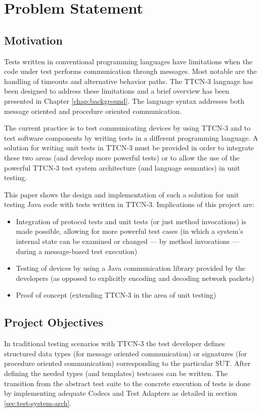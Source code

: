 \chapter{Problem Statement}
\label{chap:motivation}


\section{Motivation}
Tests written in conventional programming languages have limitations
when the code under test performs communication through messages.
Most notable are the handling of timeouts and alternative behavior paths.
The \ac{TTCN-3} language has been designed to address these limitations
and a brief overview has been presented in Chapter \ref{chap:background}.
The language syntax addresses
both message oriented and procedure oriented communication.

The current practice is to test communicating devices
by using \ac{TTCN-3} and to test software components
by writing tests in a different programming language.
A solution for writing unit tests in \ac{TTCN-3} must be provided
in order to integrate these two areas (and develop more powerful tests)
or to allow the use of the powerful \ac{TTCN-3} test system architecture
(and language semantics) in unit testing.

This paper shows the design and implementation of such a solution
for unit testing Java code with tests written in \ac{TTCN-3}.
Implications of this project are:
\begin{itemize}
\item Integration of protocol tests and unit tests (or just method invocations)
is made possible, allowing for more powerful test cases
(in which a system's internal state can be examined or changed
--- by method invocations --- during a message-based test execution)
\item Testing of devices by using a Java communication library
provided by the developers
(as opposed to explicitly encoding and decoding network packets)
\item Proof of concept (extending \ac{TTCN-3} in the area of unit testing)
\end{itemize}


\section{Project Objectives}
\label{sec:project-objectives}
In traditional testing scenarios with \ac{TTCN-3} the test developer defines
structured data types (for message oriented communication)
or signatures (for procedure oriented communication)
corresponding to the particular \acf{SUT}.
After defining the needed types (and templates) testcases can be written.
The transition from the abstract test suite to the concrete execution of tests
is done by implementing adequate Codecs and Test Adapters
as detailed in section \ref{sec:test-system-arch}.

